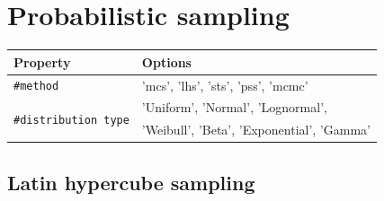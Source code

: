 \documentclass[preprint,12pt]{elsarticle}
\begin{document}
\begin{figure}[!ht]
	\caption{}
	\label{template_output}
\end{figure}



\section{Probabilistic sampling}

\begin{center}
	\begin{tabular}{ |l|l| } 
		\hline
		\textbf{Property} &  \textbf{Options} \\
		\hline
		\texttt{\#method}&  'mcs', 'lhs', 'sts', 'pss', 'mcmc'  \\ 
		\hline
		\multirow{2}{*}{\texttt{\#distribution type}} & 'Uniform', 'Normal',  'Lognormal', \\ 
		&    'Weibull', 'Beta', 'Exponential', 'Gamma'   \\ 
		\hline
	\end{tabular}
\end{center}


\subsection{Latin hypercube sampling}
\end{document}
